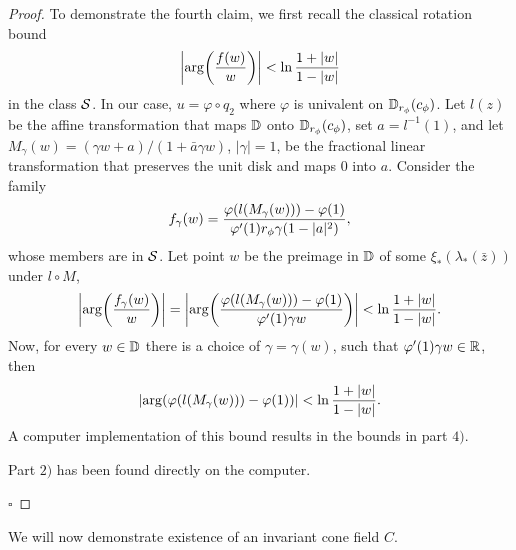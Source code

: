 \begin{proof}
To demonstrate  the fourth claim, we first recall  the classical rotation bound
$$ \left|\arg{\left( { f(w) \over w      }   \right)}  \right|<\ln {1+|w| \over 1-|w|}$$
in the class $\cS$. In our case, $u=\varphi \circ q_2$  where  $\varphi$ is univalent on $\fD_{r_\phi}(c_\phi)$. Let $l(z)$ be the affine transformation that maps $\fD$ onto $\fD_{r_\phi}(c_\phi)$, set $a=l^{-1}(1)$, and let $M_\gamma(w)=(\gamma w +a )/(1+\bar{a} \gamma w)$, $|\gamma|=1$,   be the fractional linear transformation that preserves the unit disk and  maps $0$ into $a$. Consider the family 
$$f_\gamma(w)={ \varphi(l(M_\gamma(w)))-\varphi(1)  \over \varphi'(1) r_{\phi} \gamma (1-|a|^2)},$$
whose members are in $\cS$. Let point $w$ be the preimage in $\fD$  of some $\xi_*(\lambda_*(\bar{z}))$ under $l \circ M$, 
$$  \left| \arg{ \left( { f_\gamma(w) \over w }  \right)}  \right|=\left|\arg{\left( { \varphi(l(M_\gamma(w)))-\varphi(1)   \over  \varphi'(1) \gamma w} \right) } \right|<\ln {1+|w| \over 1-|w|}.$$ 
Now, for every $w \in \fD$ there is a choice of $\gamma=\gamma(w)$, such that  $ \varphi'(1) \gamma w \in \fR$, then
$$\left|\arg{ \left( \varphi(l(M_\gamma(w)))-\varphi(1) \right)  } \right|<\ln {1+|w| \over 1-|w|}.$$
A computer implementation of this bound results in the bounds in part $4)$.

Part $2)$ has been found directly on the computer.

\flushright $\square$
\end{proof}


We will now demonstrate existence of an invariant cone field $C$.



